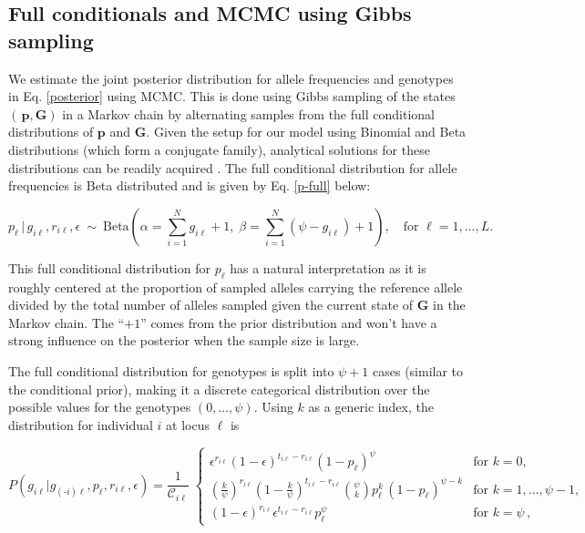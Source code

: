\documentclass[11pt,english,letterpaper,oneside]{article}
\begin{document}
\medskip
\subsection*{Full conditionals and MCMC using Gibbs sampling}
\medskip

\noindent We estimate the joint posterior distribution for allele frequencies and genotypes in Eq. \ref{posterior} using MCMC. This is done using Gibbs sampling of the states $(\,\bm{p},\bm{G})$ in a Markov chain by alternating samples from the full conditional distributions of $\bm{p}$ and $\bm{G}$. Given the setup for our model using Binomial and Beta distributions (which form a conjugate family), analytical solutions for these distributions can be readily acquired \citep{gelman2014bayesian}. The full conditional distribution for allele frequencies is Beta distributed and is given by Eq. \ref{p-full} below:

\begin{equation}\label{p-full}
p_{\ell}\,|\,g_{i \ell},r_{i \ell},\epsilon \: \sim \: \text{Beta}\left(\alpha= \sum_{i=1}^N g_{i \ell} +1,\; \beta = \sum_{i=1}^N (\psi-g_{i \ell})+1\right),\quad \text{for } \ell = 1,\ldots,L.
\end{equation}

\noindent This full conditional distribution for $p_{\ell}$ has a natural interpretation as it is roughly centered at the proportion of sampled alleles carrying the reference allele divided by the total number of alleles sampled given the current state of $\bm{G}$ in the Markov chain. The ``$+1$'' comes from the prior distribution and won't have a strong influence on the posterior when the sample size is large.
\medskip

The full conditional distribution for genotypes is split into $\psi+1$ cases (similar to the conditional prior), making it a discrete categorical distribution over the possible values for the genotypes $(0,\ldots,\psi)$. Using $k$ as a generic index, the distribution for individual $i$ at locus $\ell$ is

\begin{equation}\label{G-full}
P(g_{i \ell}|g_{(\text{-}i) \ell},p_{\ell},r_{i \ell},\epsilon) = \frac{1}{\mathcal{C}_{i \ell}} \;
	\begin{cases}
	\epsilon^{r_{i \ell}}(1-\epsilon)^{t_{i \ell}-r_{i \ell}}(1-p_{\ell})^\psi & \text{for  } k = 0, \\[0.05in]
	\left(\frac{k}{\psi}\right)^{r_{i \ell}}\left(1-\frac{k}{\psi}\right)^{t_{i \ell}-r_{i \ell}}\displaystyle\binom{\psi}{k}p_{\ell}^{k}\,(1-p_{\ell})^{\psi-k} & \text{for  } k = 1,\ldots,\psi-1, \\[0.05in]
	(1-\epsilon)^{r_{i \ell}}\epsilon^{t_{i \ell}-r_{i \ell}}p_{\ell}^\psi & \text{for  } k = \psi\,,
	\end{cases} 
\end{equation}
\end{document}
